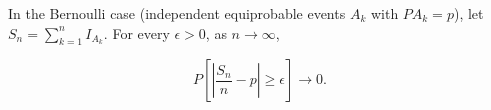 In the Bernoulli case (independent equiprobable events $A_k$ with $PA_k = p$), let $S_n = \sum_{k=1}^{n} I_{A_k}$. For every $\epsilon > 0$, as $n \to \infty$,

$$P\left[\left|\frac{S_n}{n} - p\right| \geq \epsilon\right] \to 0.$$
